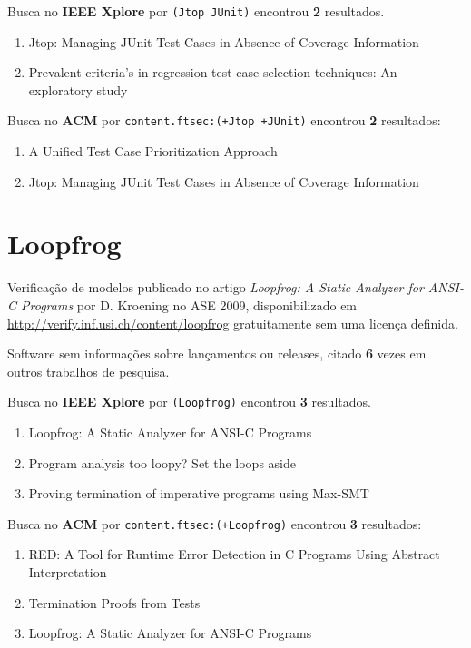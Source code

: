 Busca no {\bf IEEE Xplore} por
\texttt{(Jtop JUnit)}
encontrou {\bf 2}
resultados.

\begin{enumerate}
\item Jtop: Managing JUnit Test Cases in Absence of Coverage Information
\item Prevalent criteria's in regression test case selection techniques: An exploratory study
\end{enumerate}

Busca no {\bf ACM} por
\texttt{content.ftsec:(+Jtop +JUnit)}
encontrou {\bf 2}
resultados:

\begin{enumerate}
\item A Unified Test Case Prioritization Approach
\item Jtop: Managing JUnit Test Cases in Absence of Coverage Information
\end{enumerate}

\section{Loopfrog}

Verificação de modelos
publicado no artigo {\it Loopfrog: A Static Analyzer for ANSI-C Programs}
por D. Kroening
no ASE 2009,
disponibilizado em \url{http://verify.inf.usi.ch/content/loopfrog}
gratuitamente
sem uma licença definida.

Software sem informações sobre lançamentos ou releases,
citado {\bf 6} vezes em outros trabalhos de pesquisa.

Busca no {\bf IEEE Xplore} por
\texttt{(Loopfrog)}
encontrou {\bf 3}
resultados.

\begin{enumerate}
\item Loopfrog: A Static Analyzer for ANSI-C Programs
\item Program analysis too loopy? Set the loops aside
\item Proving termination of imperative programs using Max-SMT
\end{enumerate}

Busca no {\bf ACM} por
\texttt{content.ftsec:(+Loopfrog)}
encontrou {\bf 3}
resultados:

\begin{enumerate}
\item RED: A Tool for Runtime Error Detection in C Programs Using Abstract Interpretation
\item Termination Proofs from Tests
\item Loopfrog: A Static Analyzer for ANSI-C Programs
\end{enumerate}

